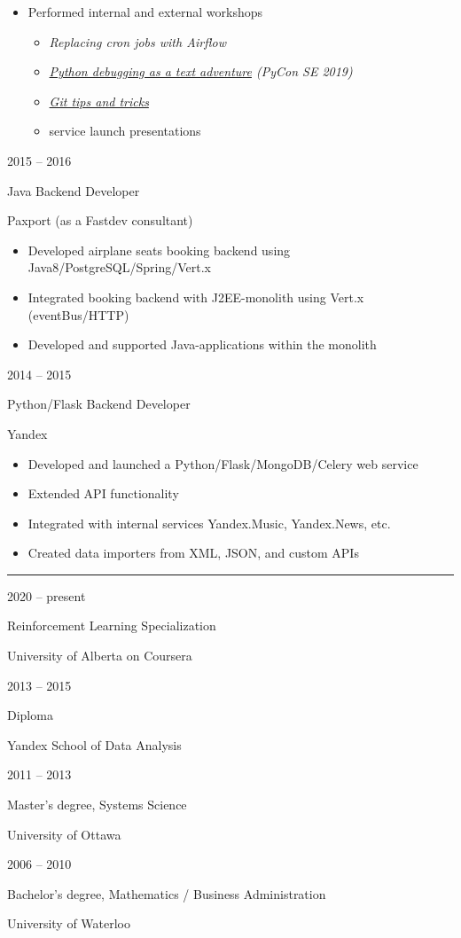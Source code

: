 \documentclass[a4paper,10pt]{article}
\newlength{\cvcolumngapwidth}
\newlength{\cvleftcolumnwidth}
\newlength{\cvrightcolumnwidth}
\newcommand{\cvsectionstyle}[1]{{\normalsize\cvsectionfont\textcolor{cvsectioncolor}{#1}}}
\newcommand{\cvtitlestyle}[1]{{\large\cvtitlefont\textcolor{cvtitlecolor}{#1}}}
\newcommand{\cvdurationstyle}[1]{{\small\cvdurationfont\textcolor{cvdurationcolor}{#1}}}
\newlength{\cvafteritemskipamount}
\newlength{\cvaftersectionskipamount}
\newlength{\cvaftertitleskipamount}
\newlength{\cvparskip}
\newcommand{\cvsection}[1]{
    \begin{minipage}[t]{\cvleftcolumnwidth}
        \raggedleft\cvsectionstyle{#1}
    \end{minipage}%
    \hspace{\cvcolumngapwidth}%
    \begin{minipage}[t]{\cvrightcolumnwidth}
        \textcolor{cvrulecolor}{\rule{\cvrightcolumnwidth}{0.3mm}}
    \end{minipage}

    \vspace{\cvaftersectionskipamount}
}
\newcommand{\cvitem}[2]{
    \begin{minipage}[t]{\cvleftcolumnwidth}
        \raggedleft #1
    \end{minipage}%
    \hspace{\cvcolumngapwidth}%
    \begin{minipage}[t]{\cvrightcolumnwidth}
        \setlength{\parskip}{\cvparskip} #2
    \end{minipage}

    \vspace{\cvafteritemskipamount}
}
\newcommand{\cvtitle}[1]{
    \cvtitlestyle{#1}

    \vspace{\cvaftertitleskipamount}
    \vspace{-\cvparskip}
}
\begin{document}
{    %

    \begin{itemize}[leftmargin=*]
        \item Performed internal and external workshops
	    \begin{itemize}[leftmargin=*]
	          \item \textit{Replacing cron jobs with Airflow}
		  \item \textit{\href{https://github.com/tipishev/python_debugging_workshop}{Python debugging as a text adventure} (PyCon SE 2019)}
		  \item \textit{\href{https://github.com/tipishev/git_workshop}{Git tips and tricks}}
		  \item service launch presentations
	    \end{itemize}
    \end{itemize}

}

\cvitem{
    \cvdurationstyle{2015 -- 2016}
}{
    \cvtitle{Java Backend Developer}

    Paxport (as a Fastdev consultant)

    \begin{itemize}[leftmargin=*]
	\item Developed airplane seats booking backend using Java8/PostgreSQL/Spring/Vert.x
	\item Integrated booking backend with J2EE-monolith using Vert.x (eventBus/HTTP)
	\item Developed and supported Java-applications within the monolith
    \end{itemize}
}

\cvitem{
    \cvdurationstyle{2014 -- 2015}
}{
    \cvtitle{Python/Flask Backend Developer}

    Yandex

    \begin{itemize}[leftmargin=*]
	\item Developed and launched a Python/Flask/MongoDB/Celery web service
	\item Extended API functionality
	\item Integrated with internal services Yandex.Music, Yandex.News, etc.
	\item Created data importers from XML, JSON, and custom APIs
    \end{itemize}
}



\cvsection{EDUCATION}

\cvitem{
    \cvdurationstyle{2020 -- present}
}{
    \cvtitle{Reinforcement Learning Specialization}
    University of Alberta on Coursera
}

\cvitem{
    \cvdurationstyle{2013 -- 2015}
}{
    \cvtitle{Diploma}
    Yandex School of Data Analysis
}

\cvitem{
    \cvdurationstyle{2011 -- 2013}
}{
    \cvtitle{Master's degree, Systems Science}
    University of Ottawa
}

\cvitem{
    \cvdurationstyle{2006 -- 2010}
}{
    \cvtitle{Bachelor's degree, Mathematics / Business Administration}
    University of Waterloo
}
\end{document}
